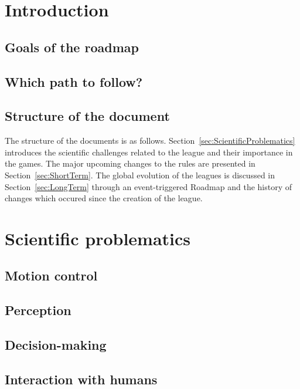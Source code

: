 \documentclass{article}
\begin{document}
\section{Introduction}



\subsection{Goals of the roadmap}

\subsection{Which path to follow?}

\subsection{Structure of the document}

The structure of the documents is as
follows. Section~\ref{sec:ScientificProblematics} introduces the scientific
challenges related to the league and their importance in the games. The major
upcoming changes to the rules are presented in Section~\ref{sec:ShortTerm}. The
global evolution of the leagues is discussed in Section~\ref{sec:LongTerm}
through an event-triggered Roadmap and the history of changes which occured
since the creation of the league.

\section{\label{sec:ScientificProblematics}Scientific problematics}

\subsection{Motion control}

\subsection{Perception}

\subsection{Decision-making}

\subsection{Interaction with humans}
\end{document}
